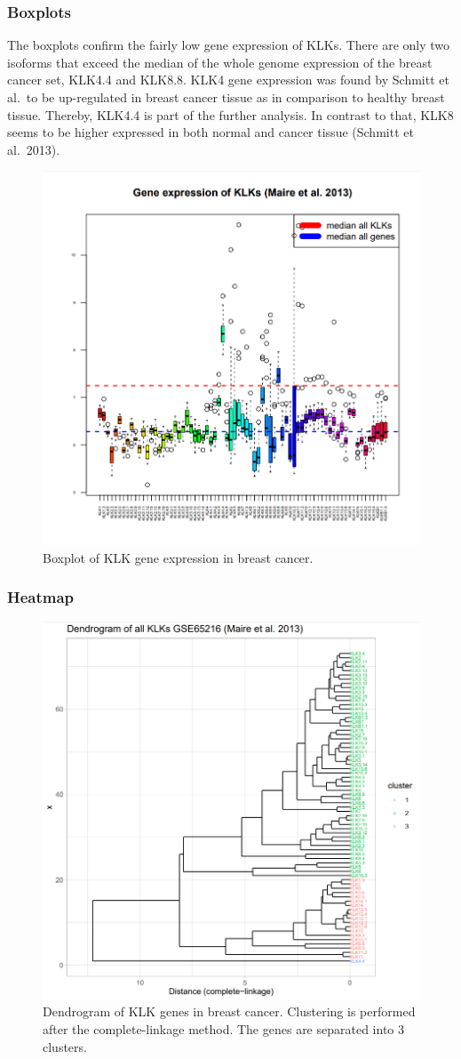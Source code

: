 \documentclass[
]{article}
\begin{document}
\hypertarget{boxplots}{%
\subsubsection{Boxplots}\label{boxplots}}

The boxplots confirm the fairly low gene expression of KLKs. There are
only two isoforms that exceed the median of the whole genome expression
of the breast cancer set, KLK4.4 and KLK8.8. KLK4 gene expression was
found by Schmitt et al.~to be up-regulated in breast cancer tissue as in
comparison to healthy breast tissue. Thereby, KLK4.4 is part of the
further analysis. In contrast to that, KLK8 seems to be higher expressed
in both normal and cancer tissue (Schmitt et al.~2013).

\begin{figure}

{\centering \includegraphics[width=0.5\linewidth]{images/Boxplot_breast} 

}

\caption{Boxplot of KLK gene expression in breast cancer.}\label{fig:Boxplot - breast }
\end{figure}

\hypertarget{heatmap}{%
\subsubsection{Heatmap}\label{heatmap}}

\begin{figure}

{\centering \includegraphics[width=0.5\linewidth]{images/Dendrogram_breast} 

}

\caption{Dendrogram of KLK genes in breast cancer. Clustering is performed after the complete-linkage method. The genes are separated into 3 clusters.}\label{fig:Dendrogram - breast }
\end{figure}
\end{document}
